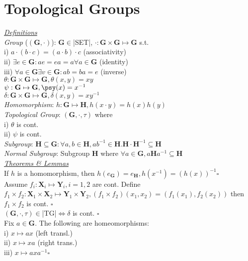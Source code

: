 \section{Topological Groups}
\underline{\emph{Definitions}}\\
\emph{Group} ($(\mathbf{G},\cdot)$): $\mathbf{G}\in$|SET|, $\cdot:\mathbf{G}\times\mathbf{G}\mapsto\mathbf{G}$ s.t.\\
i) $a\cdot(b\cdot c)=(a\cdot b)\cdot c$ (associativity)\\
ii) $\exists e\in\mathbf{G}:ae=ea=a\forall a\in\mathbf{G}$ (identity)\\
iii) $\forall a\in\mathbf{G}\exists v\in\mathbf{G}:ab=ba=e$ (inverse)\\
$\theta:\mathbf{G}\times\mathbf{G}\mapsto\mathbf{G},\theta(x,y)=xy$\\
$\psi:\mathbf{G}\mapsto\mathbf{G},\psy(x)=x^{-1}$\\
$\delta:\mathbf{G}\times\mathbf{G}\mapsto\mathbf{G},\delta(x,y)=xy^{-1}$\\
\emph{Homomorphism}: $h:\mathbf{G}\mapsto\mathbf{H},h(x\cdot y)=h(x)h(y)$\\
\emph{Topological Group}: $(\mathbf{G},\cdot,\tau)$ where\\
i) $\theta$ is cont.\\
ii) $\psi$ is cont.\\
\emph{Subgroup}: $\mathbf{H}\subseteq\mathbf{G}:\forall a,b\in\mathbf{H},ab^{-1}\in\mathbf{H}. \mathbf{H}\cdot\mathbf{H}^{-1}\subseteq\mathbf{H}$\\
\emph{Normal Subgroup}: Subgroup $\mathbf{H}$ where $\forall a\in\mathbf{G},a\mathbf{H}a^{-1}\subseteq\mathbf{H}$
\\\underline{\emph{Theorems \& Lemmas}}\\
If $h$ is a homomorphism, then $h(e_\mathbf{G})=e_\mathbf{H},h(x^{-1})=(h(x))^{-1} \square$\\
Assume $f_i:\mathbf{X}_i\mapsto\mathbf{Y}_i,i=1,2$ are cont.
Define $f_1\times f_2:\mathbf{X}_1\times\mathbf{X}_2\mapsto\mathbf{Y}_1\times\mathbf{Y}_2,(f_1\times f_2)(x_1,x_2)=(f_1(x_1),f_2(x_2))$ then $f_1\times f_2$ is cont. $\square$\\
$(\mathbf{G},\cdot,\tau)\in$|TG|$\iff\delta$ is cont. $\square$\\
Fix $a\in\mathbf{G}$. The following are homeomorphisms:\\
i) $x\mapsto ax$ (left transl.)\\
ii) $x\mapsto xa$ (right trans.)\\
iii) $x\mapsto axa^{-1} \square$\\
